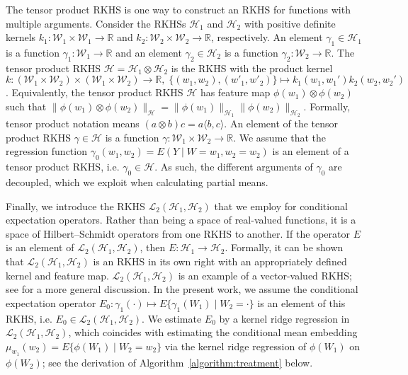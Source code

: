 The tensor product RKHS is one way to construct an RKHS for functions with multiple arguments. Consider the RKHSs $\mathcal{H}_{1}$ and $\mathcal{H}_{2}$ with positive definite kernels $k_{1}:\mathcal{W}_1\times\mathcal{W}_1\rightarrow \mathbb{R}$ and  
$k_{2}:\mathcal{W}_2\times\mathcal{W}_2\rightarrow \mathbb{R}$, respectively. An element $\gamma_1\in \mathcal{H}_{1}$ is a function $\gamma_1:\mathcal{W}_1\rightarrow \mathbb{R}$ and an element $\gamma_2\in \mathcal{H}_{2}$ is a function $\gamma_2:\mathcal{W}_2\rightarrow \mathbb{R}$. The tensor product RKHS $\mathcal{H}=\mathcal{H}_{1}\otimes \mathcal{H}_{2}$ is the RKHS with the product kernel
$
k:(\mathcal{W}_1\times \mathcal{W}_2) \times (\mathcal{W}_1\times \mathcal{W}_2)\rightarrow \mathbb{R},\; \{(w_1,w_2),(w'_1,w'_2)\}\mapsto k_{1}(w_1,w_1')  k_{2}(w_2,w_2')
$. Equivalently, the tensor product RKHS $\mathcal{H}$ has feature map $\phi(w_1)\otimes \phi(w_2)$ such that $\|\phi(w_1)\otimes \phi(w_2)\|_{\mathcal{H}}=\|\phi(w_1)\|_{\mathcal{H}_1}\|\phi(w_2)\|_{\mathcal{H}_2}$. Formally, tensor product notation means $(a\otimes b)c=a \langle b,c\rangle$. An element of the tensor product RKHS $\gamma \in\mathcal{H}$ is a function $\gamma:\mathcal{W}_1\times \mathcal{W}_2 \rightarrow \mathbb{R}$. We assume that the regression function $\gamma_0(w_1,w_2)=E(Y \mid W=w_1,w_2=w_2)$ is an element of a tensor product RKHS, i.e. $\gamma_0\in \mathcal{H}$. As such, the different arguments of $\gamma_0$ are decoupled, which we exploit when calculating partial means. %

Finally, we introduce the RKHS $\mathcal{L}_2(\mathcal{H}_{1},\mathcal{H}_{2})$ that we employ for conditional expectation operators. Rather than being a space of real-valued functions, it is a space of Hilbert--Schmidt operators from one RKHS to another. If the operator $E$ is an element of $ \mathcal{L}_2(\mathcal{H}_{1},\mathcal{H}_{2})$, then $E:\mathcal{H}_{1} \rightarrow \mathcal{H}_{2}$. Formally, it can be shown that $\mathcal{L}_2(\mathcal{H}_{1},\mathcal{H}_{2})$ is an RKHS in its own right with an appropriately defined kernel and feature map. $\mathcal{L}_2(\mathcal{H}_{1},\mathcal{H}_{2})$ is an example of a vector-valued RKHS; see \cite{micchelli2005learning} for a more general discussion. In the present work, we assume the conditional expectation operator $E_0:\gamma_1(\cdot)\mapsto E\{\gamma_1(W_1) \mid W_2=\cdot\}$ is an element of this RKHS, i.e. $E_0\in \mathcal{L}_2(\mathcal{H}_{1},\mathcal{H}_{2})$. We estimate $E_0$ by a kernel ridge regression in $\mathcal{L}_2(\mathcal{H}_{1},\mathcal{H}_{2})$, which coincides with estimating the conditional mean embedding $\mu_{w_1}(w_2)=E\{\phi(W_1) \mid W_2=w_2\}$ via the kernel ridge regression of $\phi(W_1)$ on $\phi(W_2)$; see the derivation of Algorithm~\ref{algorithm:treatment} below.

